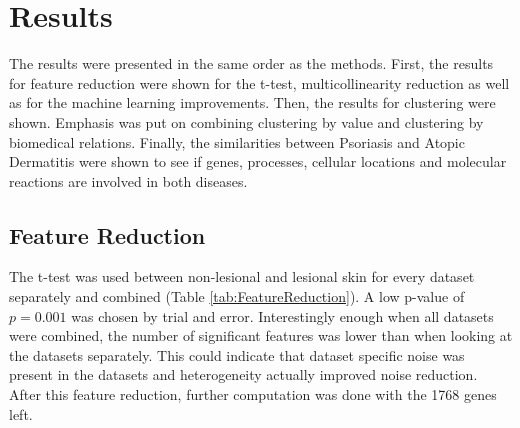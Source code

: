 \documentclass[10pt,a4paper]{article}
\begin{document}
	\section{Results}
	\label{sec:Results}
	
	The results were presented in the same order as the methods. First, the results for feature reduction were shown for the t-test, multicollinearity reduction as well as for the machine learning improvements. Then, the results for clustering were shown. Emphasis was put on combining clustering by value and clustering by biomedical relations. Finally, the similarities between Psoriasis and Atopic Dermatitis were shown to see if genes, processes, cellular locations and molecular reactions are involved in both diseases. 
	
	
	\subsection{Feature Reduction}
	\label{subsec:ResultsFeatureResuction}
	
	The t-test was used between non-lesional and lesional skin for every dataset separately and combined (Table \ref{tab:FeatureReduction}). A low p-value of $p=0.001$ was chosen by trial and error. Interestingly enough when all datasets were combined, the number of significant features was lower than when looking at the datasets separately. This could indicate that dataset specific noise was present in the datasets and heterogeneity actually improved noise reduction. After this feature reduction, further computation was done with the 1768 genes left.
	
\end{document}
